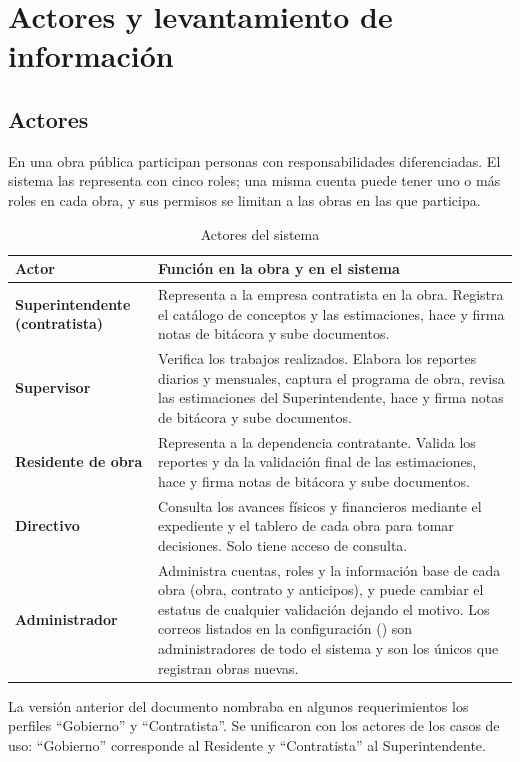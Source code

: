 \chapter{Actores y levantamiento de información}

\section{Actores}
En una obra pública participan personas con responsabilidades diferenciadas. El sistema las representa con cinco roles; una misma cuenta puede tener uno o más roles en cada obra, y sus permisos se limitan a las obras en las que participa.

\begin{xltabular}{\linewidth}{@{}>{\sffamily\bfseries\small}p{3.6cm}>{\small}X@{}}
\caption{Actores del sistema}\label{tab:actores}\\
\toprule
\normalfont\sffamily\bfseries Actor & \sffamily\bfseries Función en la obra y en el sistema\\\midrule\endfirsthead
\bottomrule\endfoot
Superintendente (contratista) & Representa a la empresa contratista en la obra. Registra el catálogo de conceptos y las estimaciones, hace y firma notas de bitácora y sube documentos.\\
Supervisor & Verifica los trabajos realizados. Elabora los reportes diarios y mensuales, captura el programa de obra, revisa las estimaciones del Superintendente, hace y firma notas de bitácora y sube documentos.\\
Residente de obra & Representa a la dependencia contratante. Valida los reportes y da la validación final de las estimaciones, hace y firma notas de bitácora y sube documentos.\\
Directivo & Consulta los avances físicos y financieros mediante el expediente y el tablero de cada obra para tomar decisiones. Solo tiene acceso de consulta.\\
Administrador & Administra cuentas, roles y la información base de cada obra (obra, contrato y anticipos), y puede cambiar el estatus de cualquier validación dejando el motivo. Los correos listados en la configuración () son administradores de todo el sistema y son los únicos que registran obras nuevas.\\
\end{xltabular}

\begin{aclaracion}[Roles]
La versión anterior del documento nombraba en algunos requerimientos los perfiles \enquote{Gobierno} y \enquote{Contratista}. Se unificaron con los actores de los casos de uso: \enquote{Gobierno} corresponde al Residente y \enquote{Contratista} al Superintendente.
\end{aclaracion}

